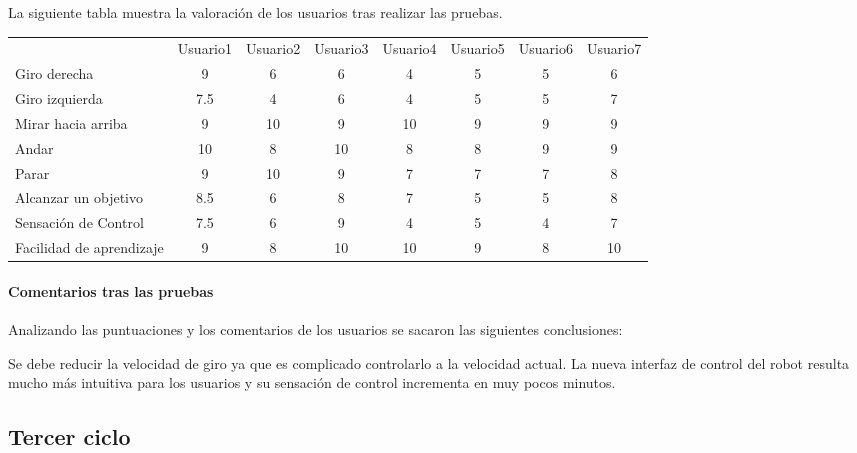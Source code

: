 \documentclass[twoside, 11pt]{epstfg}
\begin{document}
La siguiente tabla muestra la valoración de los usuarios tras realizar las pruebas.

\resizebox{15cm}{!} {
\begin{tabular}{|g  c  c  c  c  c  c  c |}
		\hline
	 \\ \hline
	& Usuario1 & Usuario2 & Usuario3 & Usuario4 & Usuario5 & Usuario6 & Usuario7\\
	
	Giro derecha & 9 & 6 & 6 & 4 & 5 & 5 & 6\\
	Giro izquierda & 7.5 & 4 & 6 & 4 & 5 & 5 & 7\\
	Mirar hacia arriba & 9 & 10 & 9 & 10 & 9 & 9 & 9\\
	Andar & 10 & 8 & 10 & 8 & 8 & 9 & 9\\
	Parar & 9 & 10 & 9 & 7 & 7 & 7 & 8\\
	Alcanzar un objetivo & 8.5 & 6 & 8 & 7 & 5 & 5 & 8\\
	Sensación de Control & 7.5 & 6 & 9 & 4 & 5 & 4 & 7\\
	Facilidad de aprendizaje & 9 & 8 & 10 & 10 & 9 & 8 & 10\\
	\hline
\end{tabular}
}

\paragraph{Comentarios tras las pruebas}

Analizando las puntuaciones y los comentarios de los usuarios se sacaron las siguientes conclusiones:

Se debe reducir la velocidad de giro ya que es complicado controlarlo a la velocidad actual.
La nueva interfaz de control del robot resulta mucho más intuitiva para los usuarios y su sensación de control incrementa en muy pocos minutos.

\subsection{Tercer ciclo}
\end{document}
